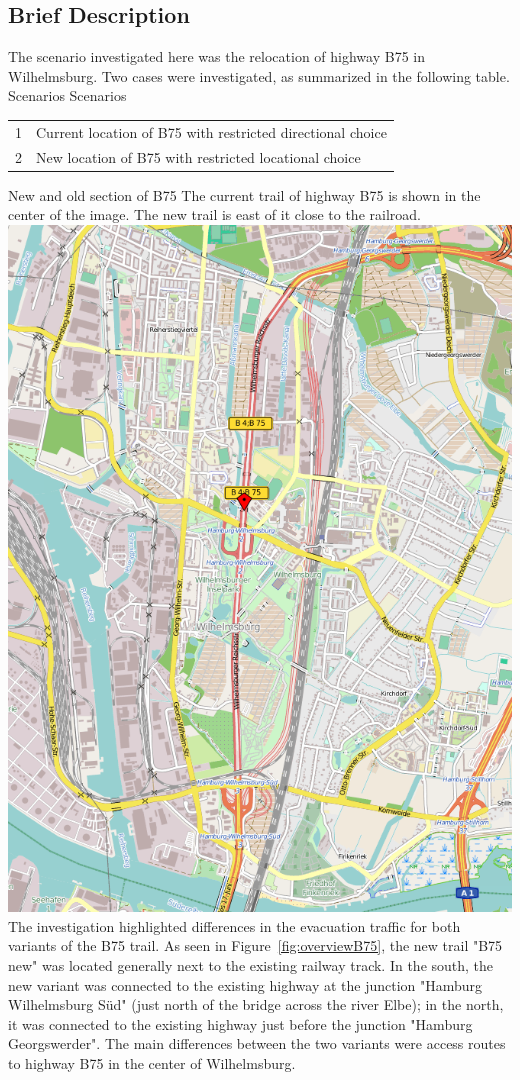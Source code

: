 \subsection{Brief Description}
The scenario investigated here was the relocation of highway B75 in Wilhelmsburg. Two cases were investigated, as summarized in the following table.
%
\createtable%
	{Scenarios}%
	{Scenarios}%
	{\label{table:b75scenarios}}%
	{%
	\begin{tabular}{|l | l|}
	\hline
	1 & Current location of B75 with restricted directional choice\\
	2 & New location of B75 with restricted locational choice\\
	\hline
\end{tabular}
}%
{}%
%
\createfigure%
	{New and old section of B75}%
	{The current trail of highway B75 is shown in the center of the image. The new trail is east of it close to the railroad.}%
	{\label{fig:overviewB75}}%
	{\includegraphics[width=0.7\linewidth]{using/figures/B75overview}}%
{}
%
The investigation highlighted differences in the evacuation traffic for both variants of the B75 trail. As seen in Figure~\ref{fig:overviewB75}, the new trail "B75 new" was located generally next to the existing railway track. In the south, the new variant was connected to the existing highway at the junction "Hamburg Wilhelmsburg Süd" (just north of the bridge across the river Elbe); in the north, it was connected to the existing highway just before the junction "Hamburg Georgswerder". The main differences between the two variants were access routes to highway B75 in the center of Wilhelmsburg.

